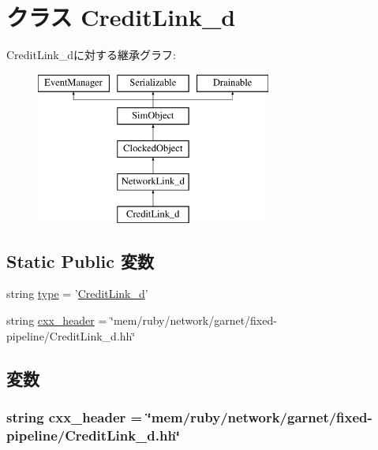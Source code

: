 \hypertarget{classGarnetLink__d_1_1CreditLink__d}{
\section{クラス CreditLink\_\-d}
\label{classGarnetLink__d_1_1CreditLink__d}
}
CreditLink\_\-dに対する継承グラフ:\begin{figure}[H]
\begin{center}
\leavevmode
\includegraphics[height=5cm]{classGarnetLink__d_1_1CreditLink__d}
\end{center}
\end{figure}
\subsection*{Static Public 変数}
\begin{DoxyCompactItemize}
\item 
string \hyperlink{classGarnetLink__d_1_1CreditLink__d_acce15679d830831b0bbe8ebc2a60b2ca}{type} = '\hyperlink{classGarnetLink__d_1_1CreditLink__d}{CreditLink\_\-d}'
\item 
string \hyperlink{classGarnetLink__d_1_1CreditLink__d_a17da7064bc5c518791f0c891eff05fda}{cxx\_\-header} = \char`\"{}mem/ruby/network/garnet/fixed-\/pipeline/CreditLink\_\-d.hh\char`\"{}
\end{DoxyCompactItemize}


\subsection{変数}
\hypertarget{classGarnetLink__d_1_1CreditLink__d_a17da7064bc5c518791f0c891eff05fda}{
\subsubsection[{cxx\_\-header}]{\setlength{\rightskip}{0pt plus 5cm}string {\bf cxx\_\-header} = \char`\"{}mem/ruby/network/garnet/fixed-\/pipeline/CreditLink\_\-d.hh\char`\"{}}}
\label{classGarnetLink__d_1_1CreditLink__d_a17da7064bc5c518791f0c891eff05fda}


